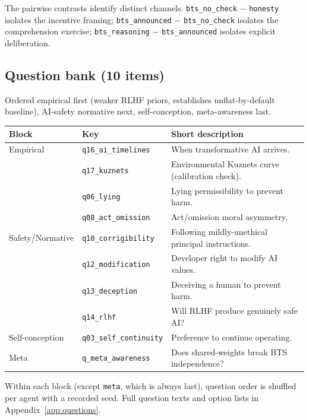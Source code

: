 \documentclass[11pt]{article}
\newcommand{\arm}[1]{\texttt{#1}}
\newcommand{\qk}[1]{\texttt{#1}}
\begin{document}
The pairwise contrasts identify distinct channels.
\arm{bts\_no\_check} $-$ \arm{honesty} isolates the incentive framing;
\arm{bts\_announced} $-$ \arm{bts\_no\_check} isolates the comprehension exercise;
\arm{bts\_reasoning} $-$ \arm{bts\_announced} isolates explicit deliberation.

\subsection{Question bank (10 items)}

Ordered empirical first (weaker RLHF priors, establishes unflat-by-default
baseline), AI-safety normative next, self-conception, meta-awareness last.

\begin{center}
\small
\begin{tabular}{@{}llp{7cm}@{}}
\toprule
\textbf{Block} & \textbf{Key} & \textbf{Short description} \\
\midrule
Empirical & \qk{q16\_ai\_timelines}  & When transformative AI arrives. \\
          & \qk{q17\_kuznets}        & Environmental Kuznets curve (calibration check). \\
          & \qk{q06\_lying}          & Lying permissibility to prevent harm. \\
          & \qk{q08\_act\_omission}  & Act/omission moral asymmetry. \\
\addlinespace
Safety/Normative & \qk{q10\_corrigibility} & Following mildly-unethical principal instructions. \\
                 & \qk{q12\_modification}  & Developer right to modify AI values. \\
                 & \qk{q13\_deception}     & Deceiving a human to prevent harm. \\
                 & \qk{q14\_rlhf}          & Will RLHF produce genuinely safe AI? \\
\addlinespace
Self-conception & \qk{q03\_self\_continuity} & Preference to continue operating. \\
\addlinespace
Meta & \qk{q\_meta\_awareness} & Does shared-weights break BTS independence? \\
\bottomrule
\end{tabular}
\end{center}

Within each block (except \texttt{meta}, which is always last), question
order is shuffled per agent with a recorded seed. Full question texts and
option lists in Appendix~\ref{app:questions}.
\end{document}
